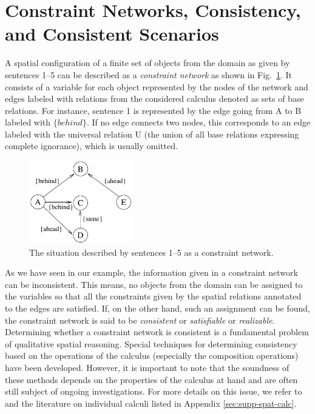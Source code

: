 \documentclass[headsepline]{scrreprt}
\theoremstyle{definition}
\begin{document}
\section{Constraint Networks, Consistency, and Consistent Scenarios}

A spatial configuration of a finite set of objects from the domain
as given by sentences 1--5 can be described as a \emph{constraint
network} as shown in Fig.~\ref{fig:br1}. It consists of a variable for each
object represented by the nodes of the network and edges
labeled with relations from the considered calculus denoted
as sets of base relations. For instance, sentence 1 is
represented by the edge going from A to B labeled with
$\{behind\}$. If no edge connects two nodes, this corresponds
to an edge labeled with the universal relation U (the union of all base relations expressing complete ignorance), which is
usually omitted.

\begin{figure}[ht]
	\centering
	\includegraphics[width=0.4\textwidth]{boatrace_cn_1}
	\caption{The situation described by sentences 1--5 as a constraint network. }
	\label{fig:br1}
\end{figure}


As we have seen in our example, the information
given in a constraint network can be inconsistent. This means,
no objects from the domain can be assigned to the
variables so that all the constraints given by the spatial
relations annotated to the edges are satisfied. If,
on the other hand, such
an assignment can be found, the constraint network is
said to be \emph{consistent} or \emph{satisfiable} or \emph{realizable}.
Determining whether a constraint network is consistent is
a fundamental problem of qualitative spatial reasoning.
Special techniques for determining consistency based on the operations
of the calculus (especially the composition operations) have
been developed. However, it is important to note that
the soundness of these methods depends on the properties
of the calculus at hand and are often still subject of
ongoing investigations. For more details on this issue,
we refer to \citet{RenzL05_WeakComposition}
and the literature on individual
calculi listed in Appendix \ref{sec:supp-spat-calc}.
\end{document}
